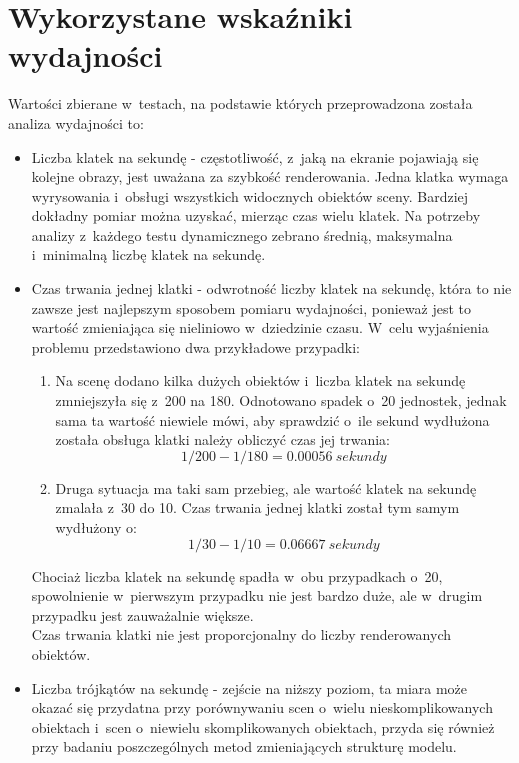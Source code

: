 \documentclass[a4paper,twoside,12pt]{book}
\begin{document}
\section{Wykorzystane wskaźniki wydajności}
\label{section:benchamarks}
Wartości zbierane w~testach, na podstawie których przeprowadzona została analiza wydajności to:
\begin{itemize}
    \item Liczba klatek na sekundę - częstotliwość, z~jaką na ekranie pojawiają się kolejne obrazy, jest uważana za szybkość renderowania. Jedna klatka wymaga wyrysowania i~obsługi wszystkich widocznych obiektów sceny. Bardziej dokładny pomiar można uzyskać, mierząc czas wielu klatek. Na potrzeby analizy z~każdego testu dynamicznego zebrano średnią, maksymalna i~minimalną liczbę klatek na sekundę.
    \item Czas trwania jednej klatki - odwrotność liczby klatek na sekundę, która to nie zawsze jest najlepszym sposobem pomiaru wydajności, ponieważ jest to wartość zmieniająca się nieliniowo w~dziedzinie czasu. W~celu wyjaśnienia problemu przedstawiono dwa przykładowe przypadki:
    \begin{enumerate}[label=(\alph*)]
        \item Na scenę dodano kilka dużych obiektów i~liczba klatek na sekundę zmniejszyła się z~200 na 180. Odnotowano spadek o~20 jednostek, jednak sama ta wartość niewiele mówi, aby sprawdzić o~ile sekund wydłużona została obsługa klatki należy obliczyć czas jej trwania: \\
        \begin{equation}
            1/200 - 1/180 = 0.00056\ sekundy
        \end{equation}
        \item Druga sytuacja ma taki sam przebieg, ale wartość klatek na sekundę zmalała z~30 do 10. Czas trwania jednej klatki został tym samym wydłużony o:
        \begin{equation}
            1/30 - 1/10 = 0.06667\ sekundy
        \end{equation}
    \end{enumerate}
    Chociaż liczba klatek na sekundę spadła w~obu przypadkach o~20, spowolnienie w~pierwszym przypadku nie jest bardzo duże, ale w~drugim przypadku jest zauważalnie większe. \\
    Czas trwania klatki nie jest proporcjonalny do liczby renderowanych obiektów.
    \item Liczba trójkątów na sekundę - zejście na niższy poziom, ta miara może okazać się przydatna przy porównywaniu scen o~wielu nieskomplikowanych obiektach i~scen o~niewielu skomplikowanych obiektach, przyda się również przy badaniu poszczególnych metod zmieniających strukturę modelu.

\end{itemize}
\end{document}
